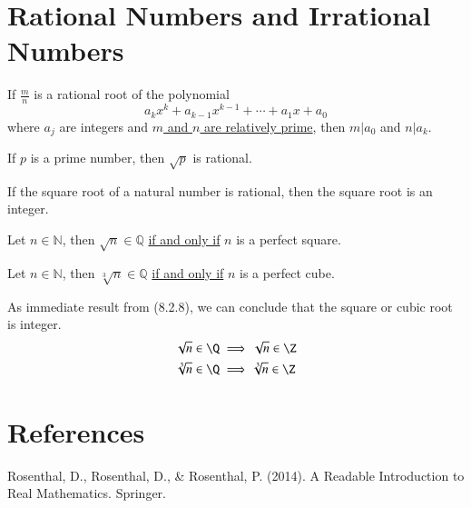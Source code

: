 \documentclass[11pt]{article}
\begin{document}
	\section{Rational Numbers and Irrational Numbers}
		\begin{theorem}
			If $\frac{m}{n}$ is a rational root of the polynomial
			\[
				a_k x^k + a_{k-1} x^{k-1} + \cdots + a_1 x + a_0
			\]
			where $a_j$ are integers and \ul{$m$ and $n$ are relatively prime}, then $m | a_0$ and $n | a_k$.
		\end{theorem}
		
		\begin{theorem}[8.2.6]
			If $p$ is a prime number, then $\sqrt{p}$ is rational.
		\end{theorem}
		
		\begin{theorem}[8.2.8]
			If the square root of a natural number is rational, then the square root is an integer.
		\end{theorem}
		
		\begin{theorem}[Extended 8.2.8]
			Let $n \in \mathbb{N}$, then $\sqrt{n} \in \mathbb{Q}$ \ul{if and only if} $n$ is a perfect square.
		\end{theorem}
		
		\begin{theorem}[Extended 8.2.8]
			Let $n \in \mathbb{N}$, then $\sqrt[3]{n} \in \mathbb{Q}$ \ul{if and only if} $n$ is a perfect cube.
		\end{theorem}
		
		\begin{remark}
			As immediate result from (8.2.8), we can conclude that the square or cubic root is integer.
			\begin{gather*}
				\sqrt{n} \in \Q \implies \sqrt{n} \in \Z \\
				\sqrt[3]{n} \in \Q \implies \sqrt[3]{n} \in \Z
			\end{gather*}
		\end{remark}
		
		\section*{References}
			Rosenthal, D., Rosenthal, D., \& Rosenthal, P. (2014). A Readable Introduction to Real Mathematics. Springer.
\end{document}
